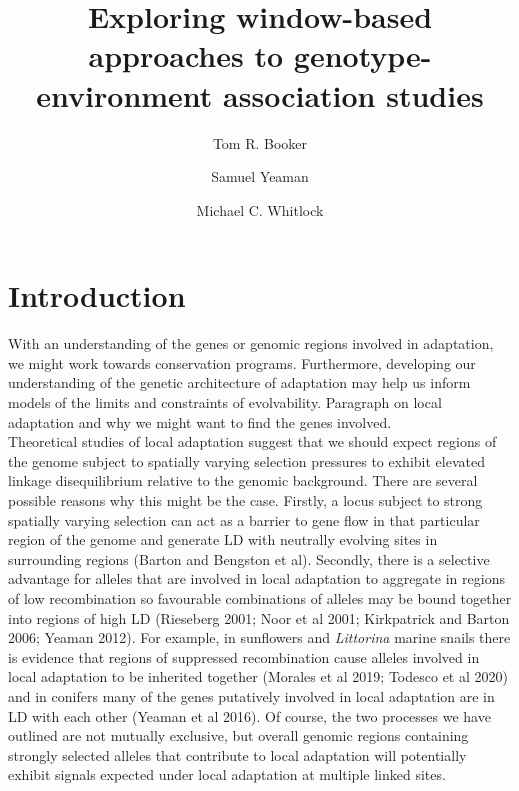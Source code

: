 \documentclass[11pt,twoside,lineno]{GSA_format}
\title{Exploring window-based approaches to genotype-environment association studies}
\author[$\ast$]{Tom R. Booker}
\author[$\dagger$]{Samuel Yeaman}
\author[$\ast$]{Michael C. Whitlock}
\affil[$\ast$]{University of British Columbia}
\affil[$\dagger$]{University of Calgary}
\begin{document}
\maketitle
\marginmark
\firstpagefootnote


\vspace{-33pt}%

\section{Introduction}

With an understanding of the genes or genomic regions involved in adaptation, we might work towards conservation programs. Furthermore, developing our understanding of the genetic architecture of adaptation may help us inform models of the limits and constraints of evolvability. 
Paragraph on local adaptation and why we might want to find the genes involved. \\

Theoretical studies of local adaptation suggest that we should expect regions of the genome subject to spatially varying selection pressures to exhibit elevated linkage disequilibrium relative to the genomic background. There are several possible reasons why this might be the case. Firstly, a locus subject to strong spatially varying selection can act as a barrier to gene flow in that particular region of the genome and generate LD with neutrally evolving sites in surrounding regions (Barton and Bengston et al). Secondly, there is a selective advantage for alleles that are involved in local adaptation to aggregate in regions of low recombination so favourable combinations of alleles may be bound together into regions of high LD (Rieseberg 2001; Noor et al 2001; Kirkpatrick and Barton 2006; Yeaman 2012). For example, in sunflowers and \textit{Littorina} marine snails there is evidence that regions of suppressed recombination cause alleles involved in local adaptation to be inherited together (Morales et al 2019; Todesco et al 2020) and in conifers many of the genes putatively involved in local adaptation are in LD with each other (Yeaman et al 2016). Of course, the two processes we have outlined are not mutually exclusive, but overall genomic regions containing strongly selected alleles that contribute to local adaptation will potentially exhibit signals expected under local adaptation at multiple linked sites. \\
\end{document}
